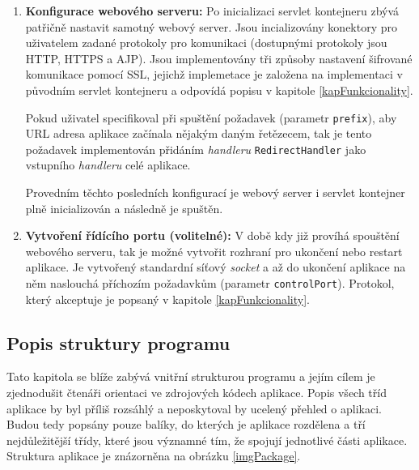 \begin{enumerate}
                
                \item \textbf{Konfigurace webového serveru:} 
                    Po inicializaci servlet kontejneru zbývá patřičně nastavit 
                    samotný webový server. Jsou incializovány konektory pro uživatelem zadané
                    protokoly pro komunikaci (dostupnými protokoly jsou HTTP, HTTPS a AJP). 
                    Jsou implementovány tři způsoby nastavení šifrované komunikace pomocí SSL, jejichž 
                    implemetace je založena na implementaci v původním servlet kontejneru
                    a odpovídá popisu v kapitole \ref{kapFunkcionality}.
                    
                    Pokud uživatel specifikoval při spuštění požadavek (parametr \texttt{prefix}), 
                    aby  URL adresa aplikace začínala 
                    nějakým daným řetězecem, tak je tento požadavek implementován
                    přidáním \emph{handleru} \texttt{RedirectHandler} jako vstupního \emph{handleru}
                    celé aplikace.

                    Provedním těchto posledních konfigurací je webový server i servlet kontejner
                    plně inicializován a následně je spuštěn.
                
                \item \textbf{Vytvoření řídícího portu (volitelné):} 
                    V době kdy již províhá spouštění webového serveru, 
                    tak je možné vytvořit rozhraní pro ukončení nebo restart aplikace.
                    Je vytvořený standardní síťový \emph{socket} a až do ukončení aplikace
                    na něm naslouchá příchozím požadavkům (parametr \texttt{controlPort}). Protokol, který akceptuje je popsaný
                    v kapitole \ref{kapFunkcionality}.

            \end{enumerate}




        \subsection{Popis struktury programu}
            Tato kapitola se blíže zabývá vnitřní strukturou programu a jejím cílem je zjednodušit 
            čtenáři orientaci ve zdrojových kódech aplikace.
            Popis všech tříd aplikace by byl příliš rozsáhlý a neposkytoval by ucelený přehled o aplikaci.
            Budou tedy popsány pouze balíky, do kterých je aplikace rozdělena a 
            tří nejdůležitější třídy, které jsou významné tím, že spojují jednotlivé části aplikace.
            Struktura aplikace je znázorněna na obrázku \ref{imgPackage}.
                    
